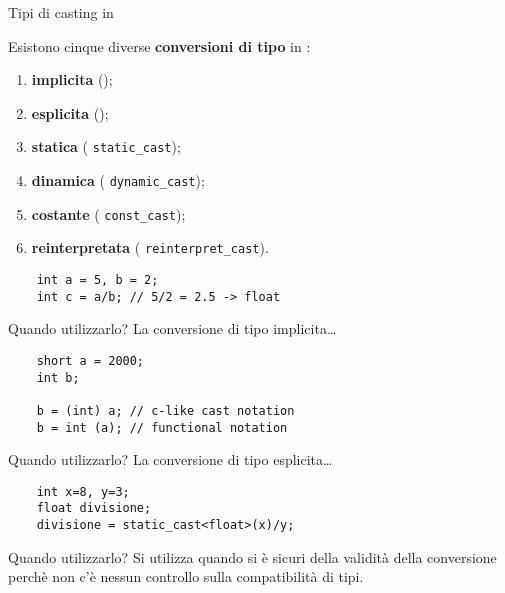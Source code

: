 \documentclass[xcolor={dvipsnames, svgnames, x11names, table}, 10pt]{beamer}
\begin{document}
\begin{frame}[t, fragile]{Tipi di casting in \cplusplus}

    Esistono cinque diverse \alert<1->{\textbf{conversioni di tipo}} in \cplusplus:

    \begin{enumerate}[<+- | alert@+>]
        \item \textbf{implicita} ();
        \item \textbf{esplicita} ();
        \item \textbf{statica} ( \texttt{static\_cast});
        \item \textbf{dinamica} ( \texttt{dynamic\_cast});
        \item \textbf{costante} ( \texttt{const\_cast});
        \item \textbf{reinterpretata} ( \texttt{reinterpret\_cast}).
    \end{enumerate}
    
    \begin{overprint}
    \begin{verbatim}
    int a = 5, b = 2;
    int c = a/b; // 5/2 = 2.5 -> float
    \end{verbatim}
    
    \begin{block}{Quando utilizzarlo?}
    La conversione di tipo implicita\dots
    \end{block}
    
    \begin{verbatim}
    short a = 2000;
    int b;
    
    b = (int) a; // c-like cast notation
    b = int (a); // functional notation
    \end{verbatim}
        
    \begin{block}{Quando utilizzarlo?}
    La conversione di tipo esplicita\dots
    \end{block}
    
    \begin{verbatim}
    int x=8, y=3;
    float divisione;
    divisione = static_cast<float>(x)/y;
    \end{verbatim}
    
    \begin{block}{Quando utilizzarlo?}
    Si utilizza quando si è sicuri della validità della conversione perchè non c'è nessun controllo sulla compatibilità di tipi.
    \end{block}
    

\end{overprint}
\end{frame}
\end{document}
